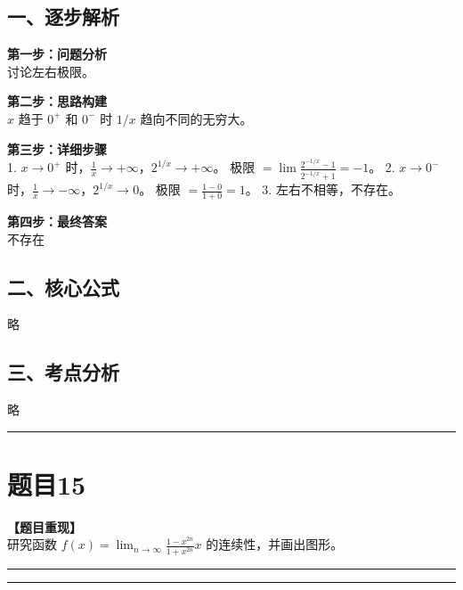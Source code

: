 \documentclass[12pt, a4paper]{ctexart}
\newcommand{\TopSeparator}{
    \par\noindent\rule{\textwidth}{1.5pt}\vspace{0.5em} %
}
\newcommand{\AnalysisSeparator}{
    \par\noindent\rule{\textwidth}{0.5pt}\vspace{0.2em}\hrule\vspace{0.5em} %
}
\newenvironment{RedAnalysis}{
    \par
    \color{red} %
}{
    \par
    \color{black} %
}
\begin{document}
\begin{RedAnalysis}

\subsection*{一、逐步解析}

\textbf{第一步：问题分析} \\
讨论左右极限。

\textbf{第二步：思路构建} \\
$x$ 趋于 $0^+$ 和 $0^-$ 时 $1/x$ 趋向不同的无穷大。

\textbf{第三步：详细步骤} \\
1. $x \to 0^+$ 时，$\frac{1}{x} \to +\infty$，$2^{1/x} \to +\infty$。
   极限 $= \lim \frac{2^{-1/x} - 1}{2^{-1/x} + 1} = -1$。
2. $x \to 0^-$ 时，$\frac{1}{x} \to -\infty$，$2^{1/x} \to 0$。
   极限 $= \frac{1-0}{1+0} = 1$。
3. 左右不相等，不存在。

\textbf{第四步：最终答案} \\
不存在

\subsection*{二、核心公式}
略

\subsection*{三、考点分析}
略

\end{RedAnalysis}

\vspace{2em}

\TopSeparator
\section*{题目15}

\textbf{【题目重现】} \\
研究函数 $ f(x)=\lim_{n\to\infty}\frac{1-x^{2n}}{1+x^{2n}}x $ 的连续性，并画出图形。

\AnalysisSeparator
\end{document}
